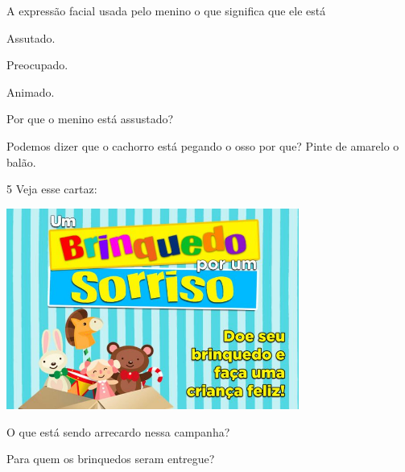 
\begin{escolha}
\item A expressão facial usada pelo menino o que significa que ele está

\begin{boxlist}
\boxitem[] Assutado.

\boxitem[] Preocupado.

\boxitem[] Animado.
\end{boxlist}

\item Por que o menino está assustado?


\item Podemos dizer que o cachorro está pegando o osso por que? Pinte de
amarelo o balão.

\end{escolha}

\num{5} Veja esse cartaz:

\includegraphics[width=3.78169in,height=2.59560in]{media/image132.jpeg}


\begin{escolha}
\item O que está sendo arrecardo nessa campanha?


\item Para quem os brinquedos seram entregue?

\end{escolha}

